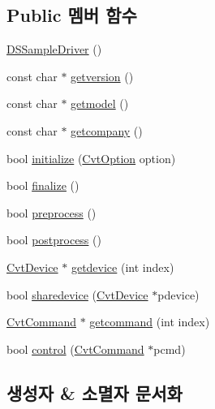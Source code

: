 \subsection*{Public 멤버 함수}
\begin{DoxyCompactItemize}
\item 
\hyperlink{classebiodriver_1_1DSSampleDriver_ab7b862bbc77a0ebdffde3931e1d889a3}{D\+S\+Sample\+Driver} ()
\item 
const char $\ast$ \hyperlink{classebiodriver_1_1DSSampleDriver_a0ce406b8c18871ab2ac506d5137543c1}{getversion} ()
\item 
const char $\ast$ \hyperlink{classebiodriver_1_1DSSampleDriver_adf31d39b45faa75dec37919861c99d9d}{getmodel} ()
\item 
const char $\ast$ \hyperlink{classebiodriver_1_1DSSampleDriver_aa0f1649252e066e3543ee962b09521e5}{getcompany} ()
\item 
bool \hyperlink{classebiodriver_1_1DSSampleDriver_aaeb74b5cfe475ecdafe87279574fe6e4}{initialize} (\hyperlink{classstdcvt_1_1CvtOption}{Cvt\+Option} option)
\item 
bool \hyperlink{classebiodriver_1_1DSSampleDriver_a21e12d56a042bc9efee56f9af7e41f7c}{finalize} ()
\item 
bool \hyperlink{classebiodriver_1_1DSSampleDriver_af7463eb1268616f1f2e677d2ad56cf63}{preprocess} ()
\item 
bool \hyperlink{classebiodriver_1_1DSSampleDriver_aa5913df52706dd85fb4d3c0b8e4e5a92}{postprocess} ()
\item 
\hyperlink{classstdcvt_1_1CvtDevice}{Cvt\+Device} $\ast$ \hyperlink{classebiodriver_1_1DSSampleDriver_a3dcd13870509c3139c6c0ad7ba22cbed}{getdevice} (int index)
\item 
bool \hyperlink{classebiodriver_1_1DSSampleDriver_a027286ae7b53a82d8d46731cfabcfea3}{sharedevice} (\hyperlink{classstdcvt_1_1CvtDevice}{Cvt\+Device} $\ast$pdevice)
\item 
\hyperlink{classstdcvt_1_1CvtCommand}{Cvt\+Command} $\ast$ \hyperlink{classebiodriver_1_1DSSampleDriver_acfccb95870864ce6dc5f99ab94c214fa}{getcommand} (int index)
\item 
bool \hyperlink{classebiodriver_1_1DSSampleDriver_a0fe50dbf8dd10f4568f25e83e7e3e873}{control} (\hyperlink{classstdcvt_1_1CvtCommand}{Cvt\+Command} $\ast$pcmd)
\end{DoxyCompactItemize}


\subsection{생성자 \& 소멸자 문서화}
